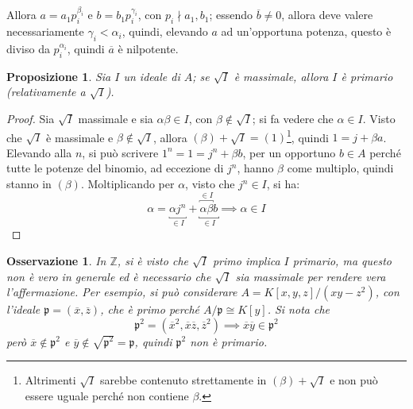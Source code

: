 \documentclass[12pt]{scrartcl}
\theoremstyle{style}
\newtheorem{prop}{Proposizione}[section]
\newtheorem{osservazione}{Osservazione}[section]
\theoremstyle{style1}
\numberwithin{equation}{subsection}
\begin{document}
Allora $a=a_1p_i^{\beta _i} $ e $b = b_1 p_i ^{\gamma_i} $, con $p_i\nmid a_1,b_1$; essendo $\overline{b}\neq 0$, allora deve valere necessariamente $\gamma_i < \alpha _i$, quindi, elevando $a$ ad un'opportuna potenza, questo \`e diviso da $p_i^{\alpha _i} $, quindi $\overline{a}$ \`e nilpotente.
\begin{prop}
Sia $I$ un ideale di $A$; se $\sqrt{I} $ \`e massimale, allora $I$ \`e primario (relativamente a $\sqrt{I} $).
\end{prop}
\begin{proof}
Sia $\sqrt{I} $ massimale e sia $\alpha \beta \in I$, con $\beta \not \in \sqrt{I} $; si fa vedere che $\alpha \in I$.
Visto che $\sqrt{I} $ \`e massimale e $\beta \not \in \sqrt{I} $, allora $(\beta ) + \sqrt{I}  = (1)$\footnote{Altrimenti $\sqrt{I} $ sarebbe contenuto strettamente in $(\beta ) + \sqrt{I} $ e non pu\`o essere uguale perch\'e non contiene $\beta $.}, quindi $1 = j + \beta a$.
Elevando alla $n$, si pu\`o scrivere $1^n = 1 = j^n + \beta b$, per un opportuno $b \in A$ perch\'e tutte le potenze del binomio, ad eccezione di $j^n$, hanno $\beta $ come multiplo, quindi stanno in $(\beta )$.
Moltiplicando per $\alpha $, visto che $j^n\in I$, si ha:
\[
	\alpha  = \underbracket{\alpha j^n }_{\in I} + \underbracket{\overbracket{\alpha  \beta}^{\in I}  b}_{\in I}  \implies \alpha \in I
\] 
\end{proof}
\begin{osservazione}
In $\mathbb{Z}$, si \`e visto che $\sqrt{I} $ primo implica $I$ primario, ma questo non \`e vero in generale ed \`e necessario che $\sqrt{I} $ sia massimale per rendere vera l'affermazione.
Per esempio, si pu\`o considerare $A = K[x,y,z] / (xy-z^2)$, con l'ideale $\mathfrak{p} =(\overline{x},\overline{z})$, che \`e primo perch\'e $A / \mathfrak{p} \cong K [y]$.
Si nota che
\[
\mathfrak{p} ^2 = (\overline{x}^2 , \overline{x}\overline{z},\overline{z}^2 ) \implies \overline{x}\overline{y} \in \mathfrak{p} ^2
\] 
per\`o $\overline{x}\not\in \mathfrak{p} ^2$ e $\overline{y}\not\in \sqrt{\mathfrak{p} ^2}=\mathfrak{p}  $, quindi $\mathfrak{p} ^2$ non \`e primario.
\end{osservazione}
\end{document}
